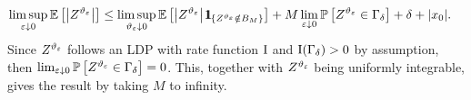 \begin{align*}
\limsup_{\eps\downarrow 0} \EE\left[ \left\vert Z^{\vartheta_{\eps}} \right\vert \right]  &\leq \limsup_{{\vartheta_{\eps}}\downarrow 0}\EE\left[ \left\vert Z^{\vartheta_{\eps}} \right\vert \ind_{\left \{Z^{\vartheta_{\eps}} \notin B_M \right \}} \right] + M\lim_{\eps\downarrow 0} \PP\left[ Z^{\vartheta_{\eps}} \in \Gamma_\delta \right ] + \delta + |x_0|.
\end{align*}
Since $Z^{\vartheta_{\varepsilon}}$ follows an LDP with rate function $\mathrm{I}$ %
and $\mathrm{I}(\Gamma_\delta)>0$ by assumption, then $\lim_{\varepsilon\downarrow 0} \mathbb{P}\left[ Z^{\vartheta_{\varepsilon}} \in \Gamma_\delta \right ] = 0$. This, together with $Z^{\vartheta_{\varepsilon}}$ being uniformly integrable, gives the result by taking $M$ to infinity.


